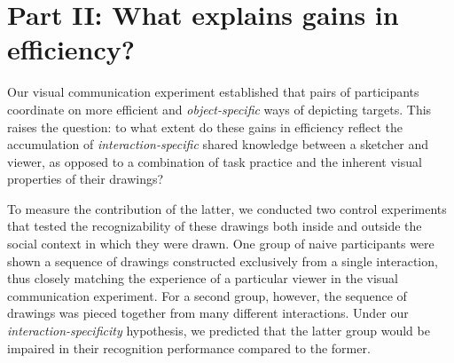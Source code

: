 \documentclass[10pt,letterpaper]{article}
\newcommand{\ndg}[1]{{\textcolor{Green}{[ndg: #1]}}}
\begin{document}


\section{Part II: What explains gains in efficiency?}

Our visual communication experiment established that pairs of participants coordinate on more efficient and \emph{object-specific} ways of depicting targets. %
This raises the question: to what extent do these gains in efficiency reflect the accumulation of \emph{interaction-specific} shared knowledge between a sketcher and viewer, as opposed to a combination of task practice and the inherent visual properties of their drawings?

To measure the contribution of the latter, we conducted two control experiments that tested the recognizability of these drawings both inside and outside the social context in which they were drawn.
One group of naive participants were shown a sequence of drawings constructed exclusively from a single interaction, thus closely matching the experience of a particular viewer in the visual communication experiment.
For a second group, however, the sequence of drawings was pieced together from many different interactions.
Under our \emph{interaction-specificity} hypothesis, we predicted that the latter group would be impaired in their recognition performance compared to the former.

\end{document}
